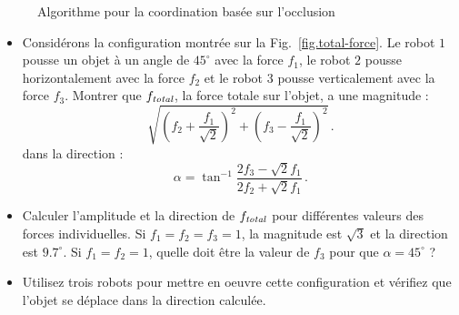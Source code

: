 \begin{figure}
\begin{center}
\end{center}
\caption{Algorithme pour la coordination basée sur l'occlusion}\label{fig.FSM-swarm-pushing}
\end{figure}

\begin{framed}
\begin{itemize}
\item Considérons la configuration montrée sur la Fig.~\ref{fig.total-force}. Le robot $1$ pousse un objet à un angle de $45^{\circ}$ avec la force $f_1$, le robot $2$ pousse horizontalement avec la force $f_2$ et le robot $3$ pousse verticalement avec la force $f_3$. Montrer que $f_{\textit{\scriptsize total}}$, la force totale sur l'objet, a une magnitude :
\[
\sqrt{\left(f_2+\frac{f_1}{\sqrt{2}}\right)^2+\left(f_3-\frac{f_1}{\sqrt{2}}\right)^2}\,.
\]
dans la direction :
\[
\alpha = \tan^{-1} \frac{2f_3-\sqrt{2}f_1}{2f_2+\sqrt{2}f_1}\,.
\]
\item Calculer l'amplitude et la direction de $f_{\textit{\scriptsize total}}$ pour différentes valeurs des forces individuelles. Si $f_1=f_2=f_3=1$, la magnitude est $\sqrt{3}$ et la direction est $9.7^{\circ}$. Si $f_1=f_2=1$, quelle doit être la valeur de $f_3$ pour que $\alpha=45^{\circ}$ ?
\item Utilisez trois robots pour mettre en oeuvre cette configuration et vérifiez que l'objet se déplace dans la direction calculée.
\end{itemize}
\end{framed}

